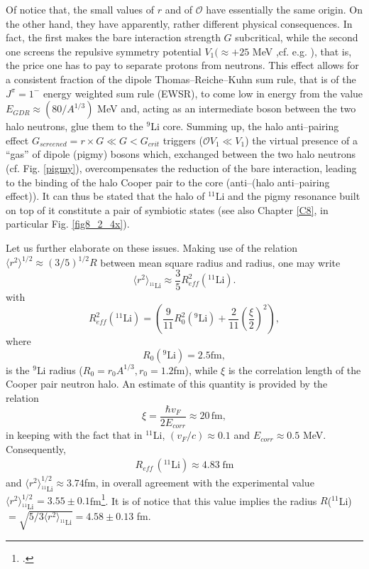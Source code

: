Of notice that, the small values of $r$ and of $\mathscr{O}$ have essentially the same origin. On the other hand, they have apparently, rather different physical consequences. In fact, the first makes the bare interaction strength $G$ subcritical, while the second one screens the repulsive symmetry potential $V_1(\approx +25 $ MeV ,cf. e.g. \cite{Bortignon:98}), that is, the price one has to pay to separate protons from neutrons. This effect allows for a consistent fraction of the dipole Thomas--Reiche--Kuhn sum rule, that is of the $J^{\pi}=1^-$ energy weighted sum rule (EWSR), to come low in energy from the value $E_{GDR}\approx(80/A^{1/3})$ MeV and, acting as an intermediate boson between the two halo neutrons, glue them to the $^{9}$Li core. Summing up, the halo anti--pairing effect $G_{screened}=r\times G\ll G<G_{crit}$ triggers ($\mathcal{O}V_1\ll V_1$) the virtual presence of a ``gas'' of dipole (pigmy) bosons which, exchanged between the two halo neutrons (cf. Fig. \ref{pigmy}), overcompensates the reduction of the bare interaction, leading to the binding of the halo Cooper pair to the core (anti--(halo anti--pairing effect)). It can thus be stated that the halo of $^{11}$Li and the pigmy resonance built on top of it constitute a pair of symbiotic states (see also Chapter \ref{C8}, in particular Fig. \ref{fig8_2_4x}).

Let us further elaborate on these issues. Making use of the relation $\langle r^2\rangle^{1/2}\approx (3/5)^{1/2}R$ between mean square radius and radius, one may write
\begin{equation*}
\langle r^2\rangle_{^{11}\text{Li}}\approx \frac{3}{5}R_{eff}^2(^{11}\text{Li}).
\end{equation*}
 with
\begin{equation*}
R_{eff}^2(^{11}\text{Li})=\left(\frac{9}{11}R_0^2(^9\text{Li})+\frac{2}{11}\left(\frac{\xi}{2}\right)^2\right),
\end{equation*}
where
\begin{equation*}
R_0(^9\text{Li})=2.5 \text{fm},
\end{equation*}
is the $^9$Li radius ($R_0=r_0A^{1/3}, r_0=1.2$fm), while $\xi$ is the correlation length of the Cooper pair neutron halo. An estimate of this quantity is provided by the relation
 \begin{equation*}
\xi=\frac{\hbar v_F}{2E_{corr}}\approx 20 \, \text{fm},
 \end{equation*}
in keeping with the fact that in $^{11}$Li, $(v_F/c)\approx 0.1$ and $E_{corr}\approx0.5$ MeV. Consequently, 
\begin{align}\label{eq2.F.5}
R_{eff}\,(^{11}\text{Li})\approx 4.83 \;\text{fm}
\end{align} 
and  $\langle r^2\rangle_{^{11}\text{Li}}^{1/2}\approx 3.74$fm, in overall agreement with the experimental value $\langle r^2\rangle_{^{11}\text{Li}}^{1/2}= 3.55\pm0.1$fm\footnote{\cite{Kobayashi:89}.}. It is of notice that this value implies  the radius $R$($^{11}$Li)$=\sqrt{5/3\langle r^2\rangle_{^{11}\text{Li}}}=4.58\pm 0.13$ fm.


